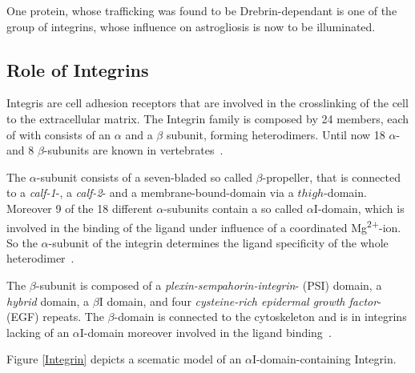 \documentclass[a4paper,11pt,bibtotocnumbered]{article}
\begin{document}


One protein, whose trafficking was found to be Drebrin-dependant is one of the group of integrins, whose influence on astrogliosis is now to be illuminated.


\subsection{Role of Integrins}

Integris are cell adhesion receptors that are involved in the crosslinking of the cell to the extracellular matrix. The Integrin family is composed by 24 members, each of with consists of an $\alpha$ and a $\beta$ subunit, forming heterodimers. Until now 18 $\alpha$- and 8 $\beta$-subunits are known in vertebrates~\cite{Barczyk2010}. 

The $\alpha$-subunit consists of a seven-bladed so called $\beta$-propeller, that is connected to a \textit{calf-1}-, a \textit{calf-2}- and a membrane-bound-domain via a $thigh$-domain. Moreover 9 of the 18 different $\alpha$-subunits contain a so called $\alpha$I-domain, which is involved in the binding of the ligand under influence of a coordinated Mg\textsuperscript{2+}-ion. So the $\alpha$-subunit of the integrin determines the ligand specificity of the whole heterodimer~\cite{Barczyk2010}. 

The $\beta$-subunit is composed of a \textit{plexin-sempahorin-integrin}- (PSI) domain, a \textit{hybrid} domain, a $\beta$I domain, and four \textit{cysteine-rich epidermal growth factor}- (EGF) repeats. The $\beta$-domain is connected to the cytoskeleton and is in integrins lacking of an $\alpha$I-domain moreover involved in the ligand binding~\cite{Barczyk2010}. 

Figure \ref{Integrin} depicts a scematic model of an $\alpha$I-domain-containing Integrin.



\end{document}
